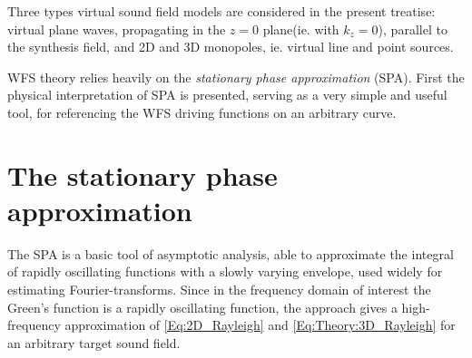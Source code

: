 \documentclass[12pt,a4paper]{article}
\begin{document}
\vspace{3mm}
Three types virtual sound field models are considered in the present treatise: virtual plane waves, propagating in the $z=0$ plane(ie. with $k_z = 0$), parallel to the synthesis field, and 2D and 3D monopoles, ie. virtual line and point sources.

\vspace{3mm}
WFS theory relies heavily on the \emph{stationary phase approximation} (SPA). First the physical interpretation of SPA is presented, serving as a very simple and useful tool, for referencing the WFS driving functions on an arbitrary curve.

\section{The stationary phase approximation}

The SPA is a basic tool of asymptotic analysis, able to approximate the integral of rapidly oscillating functions with a slowly varying envelope, used widely for estimating Fourier-transforms.
Since in the frequency domain of interest the Green's function is a rapidly oscillating function, the approach gives a high-frequency approximation of \eqref{Eq:2D_Rayleigh} and \eqref{Eq:Theory:3D_Rayleigh} for an arbitrary target sound field.
\end{document}
